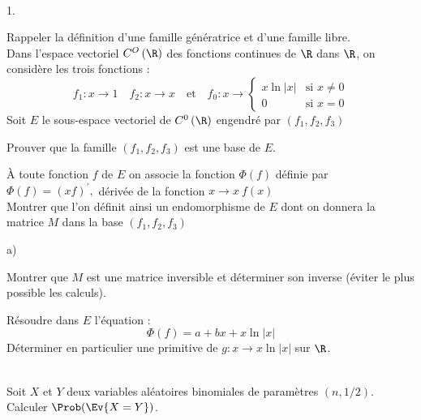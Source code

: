 \documentclass[11pt]{article}%
\begin{document}
\begin{exerciceAP}~
  \begin{noliste}{1.}
    \setlength{\itemsep}{2mm}
  \item Rappeler la définition d'une famille génératrice et d'une
    famille libre.\\[.2cm]
    Dans l'espace vectoriel $C^{O}\left( \R\right) $ des fonctions
    continues de $\R$ dans $\R$, on considère les trois
    fonctions :
    \[
    f_{1}:x\rightarrow 1\quad f_{2}:x\rightarrow x\quad \text{et}
    \quad f_{0}:x\rightarrow \left \{
      \begin{array}{cc}
        x\ln \left \vert x\right \vert & \text{si }x\neq 0 \\ 
        0 & \text{si }x=0%
      \end{array}%
    \right. 
    \]
    Soit $E$ le sous-espace vectoriel de $C^{0}\left( \R%
    \right) $ engendré par $\left( f_{1},f_{2},f_{3}\right) $

  \item Prouver que la famille $\left( f_{1},f_{2},f_{3}\right) $ est
    une base de $E$.

  \item À toute fonction $f$ de $E$ on associe la fonction $\Phi
    \left( f\right) $ définie par $\Phi \left( f\right) =\left(
      xf\right) ^{\prime
    },$ dérivée de la fonction $x\rightarrow x~f\left( x\right) $\\
    Montrer que l'on définit ainsi un endomorphisme de $E$ dont on
    donnera la matrice $M$ dans la base $\left(
      f_{1},f_{2},f_{3}\right) $

    \begin{noliste}{a)}
      \setlength{\itemsep}{2mm}
    \item Montrer que $M$ est une matrice inversible et déterminer son
      inverse (éviter le plus possible les calculs).
      
    \item Résoudre dans $E$ l'équation :%
      \[
      \Phi \left( f\right) =a+bx+x\ln \left \vert x\right \vert
      \]
      Déterminer en particulier une primitive de $g:x\rightarrow x\ln
      \left \vert x\right \vert $ sur $\R$.
    \end{noliste}
  \end{noliste}
\end{exerciceAP}


\begin{exerciceSP}~\\
  Soit $X$ et $Y$ deux variables aléatoires binomiales de paramètres $
  \left( n,1/2\right)$.\\
  Calculer $\Prob( \Ev{X = Y} )$.
\end{exerciceSP}
\end{document}
